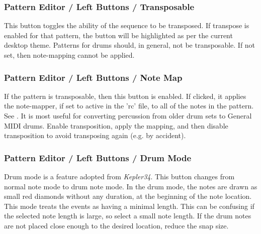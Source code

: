 
\subsubsection{Pattern Editor / Left Buttons / Transposable}
\label{subsubsec:pattern_editor_left_buttons_transposable}

   This button toggles the ability of the sequence to be transposed.
   If transpose is enabled for that pattern, the button will be highlighted as
   per the current desktop theme.  Patterns for drums should, in general, not
   be transposable.
   If not set, then note-mapping cannot be applied.

\subsubsection{Pattern Editor / Left Buttons / Note Map}
\label{subsubsec:pattern_editor_left_buttons_note_map}

   If the pattern is transposable, then this button is enabled.
   If clicked, it applies the note-mapper, if set to active in the
   'rc' file, to all of the notes in the pattern.
   See .
   It is most useful for converting percussion from older drum sets to
   General MIDI drums.  Enable transposition, apply the mapping, and then
   disable transposition to avoid transposing again (e.g. by accident).

\subsubsection{Pattern Editor / Left Buttons / Drum Mode}
\label{subsubsec:pattern_editor_left_buttons_drum_mode}

   Drum mode is a feature adopted from \textsl{Kepler34}.
   This button changes from normal note mode to drum note mode.
   In the drum mode, the notes are drawn as small red diamonds
   without any duration, at the beginning of the note location.
   This mode treats the events as having a minimal length.
   This can be confusing if the selected note length is large,
   so select a small note length.
   If the drum notes are not placed close enough to the desired
   location, reduce the snap size.

